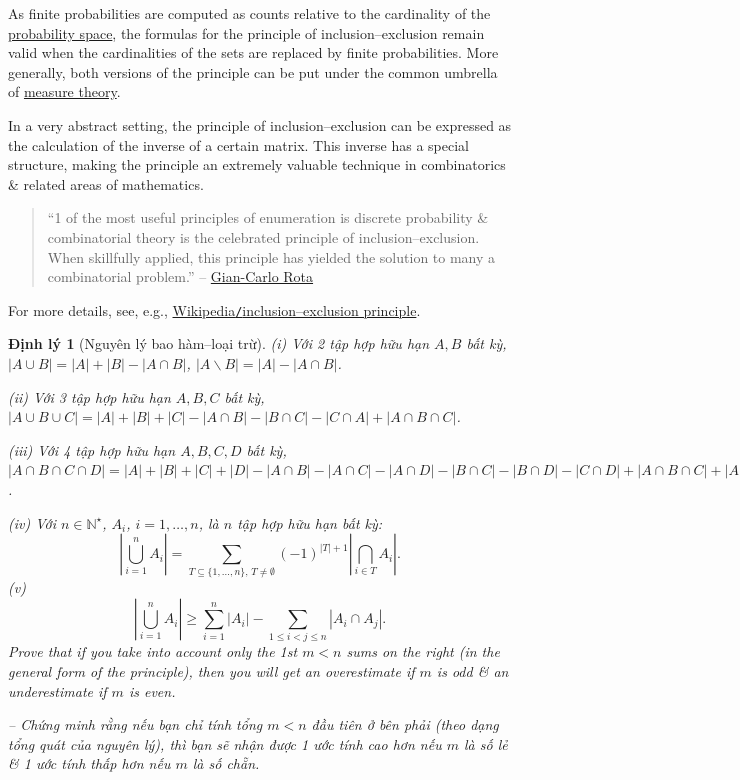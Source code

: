 \documentclass[oneside]{book}
\newtheorem{dinhly}{Định lý}
\begin{document}
As finite probabilities are computed as counts relative to the cardinality of the \href{https://en.wikipedia.org/wiki/Probability_space}{probability space}, the formulas for the principle of inclusion--exclusion remain valid when the cardinalities of the sets are replaced by finite probabilities. More generally, both versions of the principle can be put under the common umbrella of \href{https://en.wikipedia.org/wiki/Measure_theory}{measure theory}.

In a very abstract setting, the principle of inclusion--exclusion can be expressed as the calculation of the inverse of a certain matrix. This inverse has a special structure, making the principle an extremely valuable technique in combinatorics \& related areas of mathematics.
\begin{quotation}
	``1 of the most useful principles of enumeration is discrete probability \& combinatorial theory is the celebrated principle of inclusion--exclusion. When skillfully applied, this principle has yielded the solution to many a combinatorial problem.'' -- \href{https://en.wikipedia.org/wiki/Gian-Carlo_Rota}{\sc Gian-Carlo Rota}
\end{quotation}
For more details, see, e.g., \href{https://en.wikipedia.org/wiki/Inclusion%E2%80%93exclusion_principle}{Wikipedia{\tt/}inclusion--exclusion principle}.

\begin{dinhly}[Nguyên lý bao hàm--loại trừ]
	\item(i) Với 2 tập hợp hữu hạn $A,B$ bất kỳ, $|A\cup B| = |A| + |B| - |A\cap B|$, $|A\backslash B| = |A| - |A\cap B|$.
	\item(ii) Với 3 tập hợp hữu hạn $A,B,C$ bất kỳ, $|A\cup B\cup C| = |A| + |B| + |C| - |A\cap B| - |B\cap C| - |C\cap A| + |A\cap B\cap C|$.
	\item(iii) Với 4 tập hợp hữu hạn $A,B,C,D$ bất kỳ, $|A\cap B\cap C\cap D| = |A| + |B| + |C| + |D| - |A\cap B| - |A\cap C| - |A\cap D| - |B\cap C| - |B\cap D| - |C\cap D| + |A\cap B\cap C| + |A\cap B\cap D| + |A\cap C\cap D| + |B\cap C\cap D| - |A\cap B\cap C\cap D|$.
	\item(iv) Với $n\in\mathbb{N}^\star$, $A_i$, $i = 1,\ldots,n$, là $n$ tập hợp hữu hạn bất kỳ:
	\begin{equation*}
		\left|\bigcup_{i=1}^n A_i\right| = \sum_{T\subseteq\{1,\ldots,n\},\,T\ne\emptyset} (-1)^{|T| + 1}\left|\bigcap_{i\in T} A_i\right|.
	\end{equation*}
	(v)
	\begin{equation*}
		\left|\bigcup_{i=1}^n A_i\right|\ge\sum_{i=1}^n |A_i| - \sum_{1\le i < j\le n} |A_i\cap A_j|.
	\end{equation*}
	Prove that if you take into account only the 1st $m < n$ sums on the right (in the general form of the principle), then you will get an overestimate if $m$ is odd \& an underestimate if $m$ is even.
	
	-- Chứng minh rằng nếu bạn chỉ tính tổng $m < n$ đầu tiên ở bên phải (theo dạng tổng quát của nguyên lý), thì bạn sẽ nhận được 1 ước tính cao hơn nếu $m$ là số lẻ \& 1 ước tính thấp hơn nếu $m$ là số chẵn.	
\end{dinhly}
\end{document}
